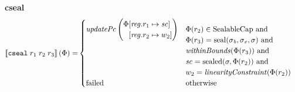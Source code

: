 \documentclass[a3paper]{article}
\newcommand{\sem}[1]{\left\llbracket #1 \right\rrbracket}
\newcommand{\tand}{\text{ and }}
\newcommand{\totherwise}{\text{otherwise }}
\newcommand{\targetcolor}[1]{\color{black}}
\newcommand{\trg}[1]{{\targetcolor{} #1}}
\newcommand{\zinstr}[1]{\texttt{#1}}
\newcommand{\threeinstr}[4]{
  \ifthenelse{\equal{#2#3#4}{}}
  {\zinstr{#1}}
  {\zinstr{#1} \; #2 \; #3 \; #4}
}
\newcommand{\tcseal}[3]{\threeinstr{\trg{cseal}}{#1}{#2}{#3}}
\newcommand{\update}[2]{[#1 \mapsto #2]}
\newcommand{\updReg}[2]{\update{\reg.#1}{#2}}
\newcommand{\shareddom}[1]{\mathrm{#1}}
\newcommand{\SealableCaps}{\shareddom{SealableCap}}
\newcommand{\seal}[1]{\shareddom{seal}(#1)}
\newcommand{\sealed}[1]{\shareddom{sealed}(#1)}
\newcommand{\failed}{\mathrm{failed}}
\newcommand{\var}[1]{\mathit{#1}}
\newcommand{\reg}{\var{reg}}
\newcommand{\vsc}{\var{sc}}
\newcommand{\baddr}{\var{b}}
\newcommand{\eaddr}{\var{e}}
\newcommand{\plainfun}[2]{
  \ifthenelse{\equal{#2}{}}
  {\mathit{#1}}
  {\mathit{#1}(#2)}
}
\newcommand{\linCons}[1]{\plainfun{linearityConstraint}{#1}}
\newcommand{\updPcAddr}[1]{\plainfun{updatePc}{#1}}
\newcommand{\withinBounds}[1]{\plainfun{withinBounds}{#1}}
\begin{document}
\noindent\textbf{cseal}\\
\begin{align*}
  \sem{\tcseal{r_1}{r_2}{r_3}}(\Phi) = &
                                  \begin{cases}
                                    \updPcAddr{}\left(
                                    \arraycolsep=0pt
                                    \begin{array}{rl}
                                      \Phi&\updReg{r_1}{\vsc}\\
                                          &\updReg{r_2}{w_2}
                                    \end{array}\right)
&
                                    \arraycolsep=0pt
                                    \begin{array}[t]{l}
                                      \Phi(r_2) \in \SealableCaps \tand \\
                                      \Phi(r_3) = \seal{\sigma_\baddr, \sigma_\eaddr,\sigma} \tand \\
                                      \withinBounds{\Phi(r_3)} \tand \\
                                      \vsc = \sealed{\sigma,\Phi(r_2)} \tand\\
                                      w_2 = \linCons{\Phi(r_2)}                                     
                                    \end{array}
                                    \\
                                    \failed & \totherwise
                                  \end{cases}
\end{align*}
\end{document}
